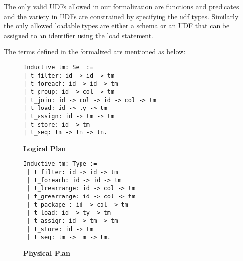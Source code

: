 The only valid UDFs allowed in our formalization are functions and predicates and the variety in UDFs are constrained by specifying the udf types. Similarly the only allowed loadable types are either a schema or an UDF that can be assigned to an identifier using the load statement.


The terms defined in the formalized are mentioned as below:

\begin{figure}
\begin{minipage}{0.4\linewidth}
\begin{lstlisting}
Inductive tm: Set :=
| t_filter: id -> id -> tm
| t_foreach: id -> id -> tm 
| t_group: id -> col -> tm
| t_join: id -> col -> id -> col -> tm
| t_load: id -> ty -> tm
| t_assign: id -> tm -> tm
| t_store: id -> tm
| t_seq: tm -> tm -> tm.
\end{lstlisting}
\caption{\textbf{Logical Plan}}
\end{minipage}

\begin{minipage}{0.4\linewidth}
\begin{lstlisting}
Inductive tm: Type :=
 | t_filter: id -> id -> tm
 | t_foreach: id -> id -> tm 
 | t_lrearrange: id -> col -> tm
 | t_grearrange: id -> col -> tm
 | t_package : id -> col -> tm
 | t_load: id -> ty -> tm
 | t_assign: id -> tm -> tm
 | t_store: id -> tm
 | t_seq: tm -> tm -> tm.
\end{lstlisting}
\caption{\textbf{Physical Plan}}
\end{minipage}
\end{figure}

